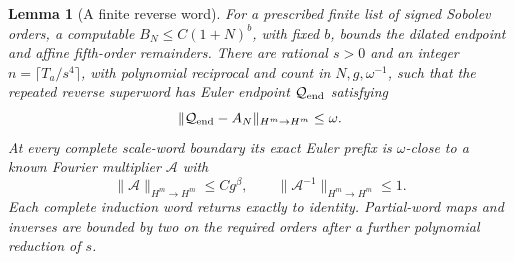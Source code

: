 \documentclass[11pt,a4paper]{amsart}
\newtheorem{lemma}[theorem]{Lemma}
\theoremstyle{definition}
\theoremstyle{remark}
\numberwithin{equation}{section}
\newcommand{\norm}[1]{\lVert #1\rVert}
\begin{document}
\begin{lemma}[A finite reverse word]\label{lem:amp-word}
For a prescribed finite list of signed Sobolev orders, a computable
$B_N\le C(1+N)^b$, with fixed $b$, bounds the dilated endpoint and
affine fifth-order remainders.  There are rational $s>0$ and an integer
$n=\lceil T_a/s^4\rceil$, with polynomial reciprocal and count in
$N,g,\omega^{-1}$, such that the repeated reverse superword has Euler
endpoint $\mathcal Q_{\rm end}$ satisfying
\begin{equation}\label{eq:amp-word-error}
\norm{\mathcal Q_{\rm end}-A_N}_{H^m\to H^m}\le\omega .
\end{equation}
At every complete scale-word boundary its exact Euler prefix is
$\omega$-close to a known Fourier multiplier $\mathcal A$ with
\begin{equation}\label{eq:amp-prefix}
 \norm{\mathcal A}_{H^m\to H^m}\le Cg^\beta,\qquad
 \norm{\mathcal A^{-1}}_{H^m\to H^m}\le1 .
\end{equation}
Each complete induction word returns exactly to identity.  Partial-word
maps and inverses are bounded by two on the required orders after a
further polynomial reduction of $s$.
\end{lemma}
\end{document}

